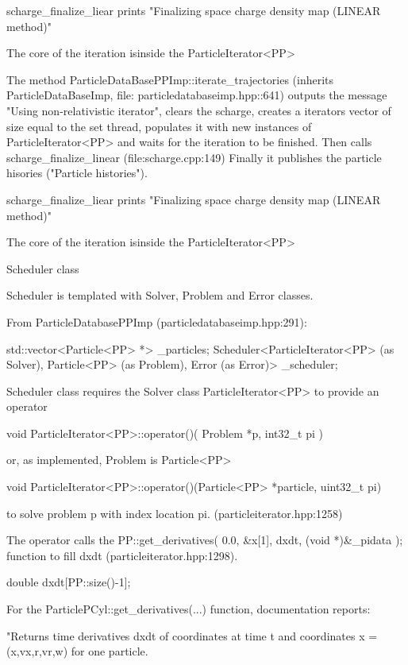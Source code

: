 \documentclass[12pt,a4paper]{article}
\begin{document}
scharge\_finalize\_liear prints "Finalizing space charge density map (LINEAR method)"

The core of the iteration isinside the ParticleIterator<PP>



The method ParticleDataBasePPImp::iterate\_trajectories (inherits ParticleDataBaseImp, file: particledatabaseimp.hpp::641) outputs the message "Using non-relativistic iterator", clears the scharge, creates a iterators vector of size equal to the set thread, populates it with new instances of ParticleIterator<PP> and waits for the iteration to be finished. Then calls scharge\_finalize\_linear (file:scharge.cpp:149) Finally it publishes the particle hisories ("Particle histories").

scharge\_finalize\_liear prints "Finalizing space charge density map (LINEAR method)"

The core of the iteration isinside the ParticleIterator<PP>


Scheduler class 

Scheduler is templated with Solver, Problem and Error classes. 

From ParticleDatabasePPImp (particledatabaseimp.hpp:291):

std::vector<Particle<PP> *>                        \_particles;
Scheduler<ParticleIterator<PP> (as Solver), Particle<PP> (as Problem), Error (as Error)> \_scheduler;



Scheduler class requires the Solver class ParticleIterator<PP> to provide an operator

  void ParticleIterator<PP>::operator()( Problem *p, int32\_t pi )

or, as implemented, Problem is Particle<PP>

 void ParticleIterator<PP>::operator()(Particle<PP> *particle, uint32\_t pi)
  
to solve problem p with index location pi. (particleiterator.hpp:1258)

The operator calls the PP::get\_derivatives( 0.0, \&x[1], dxdt, (void *)\&\_pidata ); function to 
fill dxdt (particleiterator.hpp:1298).

double dxdt[PP::size()-1];

For the ParticlePCyl::get\_derivatives(...) function, documentation reports:

"Returns time derivatives dxdt of coordinates at time t and coordinates x = (x,vx,r,vr,w) for one particle.
\end{document}

